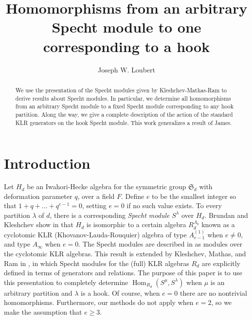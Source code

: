 \documentclass[twoside,11pt,reqno,letter]{amsart}
\numberwithin{equation}{section}
\theoremstyle{definition}  %
\newcommand{\Hom}{\operatorname{Hom}}
\newcommand{\0}{{\bar 0}}
\newcommand{\1}{{\bar 1}}
\newcommand{\la}{\lambda}
\newcommand{\La}{\Lambda}
\def\Si{\mathfrak{S}}
\begin{document}
\title[Specht module homomorphisms]{Homomorphisms from an arbitrary Specht module to one corresponding to a hook}

\author{\sc Joseph W. Loubert}
\address{Department of Mathematics\\ University of Oregon\\
Eugene\\ OR~97403, USA}
\begin{abstract}
We use the presentation of the Specht modules given by Kleshchev-Mathas-Ram to derive results about Specht modules. In particular, we determine all homomorphisms from an arbitrary Specht module to a fixed Specht module corresponding to any hook partition. Along the way, we give a complete description of the action of the standard KLR generators on the hook Specht module. This work generalizes a result of James.
\end{abstract}

\maketitle

\section{Introduction}
Let $H_d$ be an Iwahori-Hecke algebra for the symmetric group $\Si_d$ with deformation parameter $q$, over a field $F$. Define $e$ to be the smallest integer so that $1 + q + \dots + q^{e-1} = 0$, setting $e=0$ if no such value exists.
To every partition $\la$ of $d$, there is a corresponding \emph{Specht module} $S^\la$ over $H_d$.
Brundan and Kleshchev show in \cite{BK} that $H_d$ is isomorphic to a certain algebra $R^{\La_0}_d$ known as a cyclotomic KLR (Khovanov-Lauda-Rouquier) algebra of type $A^{(1)}_{e-1}$ when $e\neq 0$, and type $A_\infty$ when $e = 0$.
The Specht modules are described in \cite{BKW} as modules over the cyclotomic KLR algebras.
This result is extended by Kleshchev, Mathas, and Ram in \cite{KMR}, in which Specht modules for the (full) KLR algebras $R_d$ are explicitly defined in terms of generators and relations. 
The purpose of this paper is to use this presentation to completely determine $\Hom_{R_d}(S^\mu, S^\la)$ when $\mu$ is an arbitrary partition and $\la$ is a hook.
Of course, when $e=0$ there are no nontrivial homomorphisms. Furthermore, our methods do not apply when $e=2$, so we make the assumption that $e \geq 3$.
\end{document}
